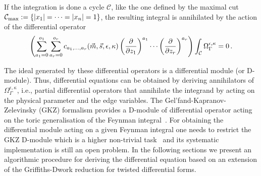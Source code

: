 \documentclass[a4paper,12pt]{article}
\numberwithin{equation}{section}
\numberwithin{figure}{section}
\begin{document}
If the integration is done a cycle $\mathcal C$, like the one
defined  by the maximal cut $\mathcal C_{\rm
  max}:=\{|x_1|=\cdots=|x_n|=1\}$,  the resulting integral is
annihilated by the  action of the differential operator~\cite{Vanhove:2018mto}
\begin{equation}
	\left( \sum_{a_1=0}^{o_1} \sum_{ a_r=0}^{o_r} c_{a_1,\dots,a_r}(\vec m,\vec s,\epsilon,\kappa)\left(\partial\over \partial z_1\right)^{a_1}\cdots\left(\partial
	\over\partial z_r\right)^{a_r}  \right)\int_{\mathcal C }\Omega^{\epsilon,\kappa}_\Gamma=0\,.
\end{equation}
%


The ideal  generated by these
differential operators is a differential module (or D-module).  Thus,
differential equations can be obtained by deriving  annihilators  of
$\Omega_\Gamma^{\epsilon,\kappa}$, i.e., partial differential operators that
annihilate  the integrand by acting on the physical parameter and the
edge variables.   The Gel'fand-Kapranov-Zelevinsky (GKZ) formalism provides
a D-module of differential operator acting on the toric generalisation
of the Feynman
integral~\cite{Vanhove:2018mto,delaCruz:2019skx,Klausen:2019hrg,Feng:2019bdx,Klemm:2019dbm,Ananthanarayan:2022ntm,Agostini:2022cgv,
	Munch:2022ouq}.  For obtaining the differential module acting on a
given Feynman integral one needs to restrict the GKZ  D-module which
is a higher non-trivial task~\cite{delaCruz:2019skx,Chestnov:2023kww} and its systematic implementation is
still an open problem. In the following sections we present an
algorithmic procedure for deriving the differential equation based on
an extension of the Griffiths-Dwork reduction for twisted differential forms.



\end{document}
